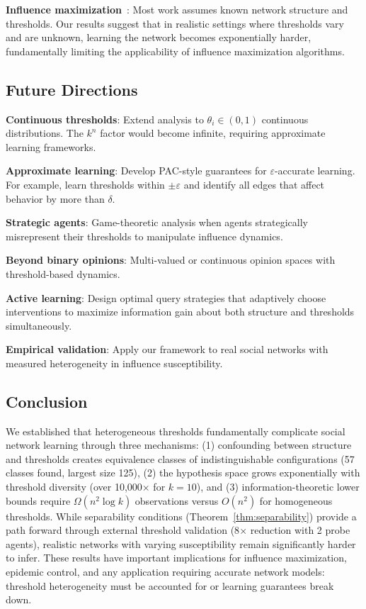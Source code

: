 \documentclass[11pt]{article}
\begin{document}
\textbf{Influence maximization}~\cite{kempe2003maximizing}: Most work assumes known network structure and thresholds. Our results suggest that in realistic settings where thresholds vary and are unknown, learning the network becomes exponentially harder, fundamentally limiting the applicability of influence maximization algorithms.

\subsection{Future Directions}

\textbf{Continuous thresholds}: Extend analysis to $\theta_i \in (0,1)$ continuous distributions. The $k^n$ factor would become infinite, requiring approximate learning frameworks.

\textbf{Approximate learning}: Develop PAC-style guarantees for $\varepsilon$-accurate learning. For example, learn thresholds within $\pm \varepsilon$ and identify all edges that affect behavior by more than $\delta$.

\textbf{Strategic agents}: Game-theoretic analysis when agents strategically misrepresent their thresholds to manipulate influence dynamics.

\textbf{Beyond binary opinions}: Multi-valued or continuous opinion spaces with threshold-based dynamics.

\textbf{Active learning}: Design optimal query strategies that adaptively choose interventions to maximize information gain about both structure and thresholds simultaneously.

\textbf{Empirical validation}: Apply our framework to real social networks with measured heterogeneity in influence susceptibility.

\subsection{Conclusion}

We established that heterogeneous thresholds fundamentally complicate social network learning through three mechanisms: (1) confounding between structure and thresholds creates equivalence classes of indistinguishable configurations (57 classes found, largest size 125), (2) the hypothesis space grows exponentially with threshold diversity (over 10,000$\times$ for $k=10$), and (3) information-theoretic lower bounds require $\Omega(n^2 \log k)$ observations versus $O(n^2)$ for homogeneous thresholds. While separability conditions (Theorem~\ref{thm:separability}) provide a path forward through external threshold validation (8$\times$ reduction with 2 probe agents), realistic networks with varying susceptibility remain significantly harder to infer. These results have important implications for influence maximization, epidemic control, and any application requiring accurate network models: threshold heterogeneity must be accounted for or learning guarantees break down.
\end{document}
